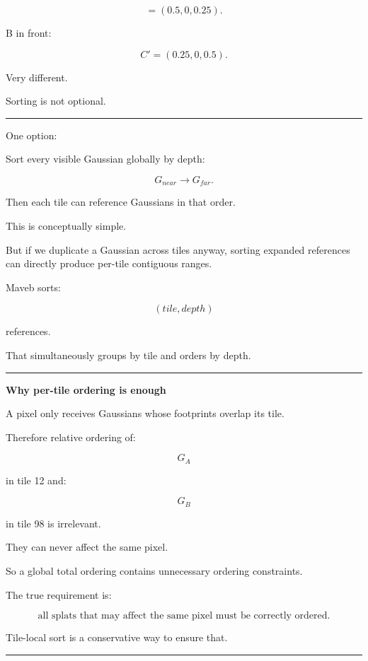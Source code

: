 \[
=
(0.5,0,0.25).
\]

B in front:

\[
C'=
(0.25,0,0.5).
\]

Very different.

Sorting is not optional.

\begin{center}\rule{0.5\linewidth}{0.5pt}\end{center}

One option:

Sort every visible Gaussian globally by depth:

\[
G_{near}\rightarrow G_{far}.
\]

Then each tile can reference Gaussians in that order.

This is conceptually simple.

But if we duplicate a Gaussian across tiles anyway, sorting expanded references can directly produce per-tile contiguous ranges.

Maveb sorts:

\[
(tile,depth)
\]

references.

That simultaneously groups by tile and orders by depth.

\begin{center}\rule{0.5\linewidth}{0.5pt}\end{center}

\textbf{Why per-tile ordering is enough}

A pixel only receives Gaussians whose footprints overlap its tile.

Therefore relative ordering of:

\[
G_A
\]

in tile 12 and:

\[
G_B
\]

in tile 98 is irrelevant.

They can never affect the same pixel.

So a global total ordering contains unnecessary ordering constraints.

The true requirement is:

\[
\boxed{
\text{all splats that may affect the same pixel must be correctly ordered}.
}
\]

Tile-local sort is a conservative way to ensure that.

\begin{center}\rule{0.5\linewidth}{0.5pt}\end{center}

